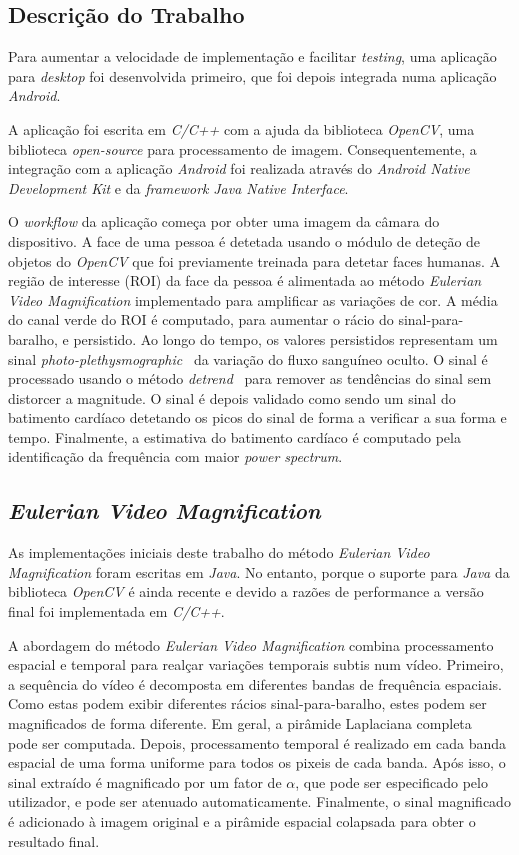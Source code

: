 \documentclass[9pt,a4paper]{extarticle}
\newcommand{\evm}{\emph{Eulerian Video Magnification}}
\begin{document}
\begin{multicols}{2}
\section{Descrição do Trabalho}\label{sec:work}

Para aumentar a velocidade de implementação e facilitar \emph{testing},
uma aplicação para \emph{desktop} foi desenvolvida primeiro, que foi
depois integrada numa aplicação \emph{Android}.

A aplicação foi escrita em \emph{C/C++} com a ajuda da biblioteca \emph{OpenCV},
uma biblioteca \emph{open-source} para processamento de imagem.
Consequentemente, a integração com a aplicação \emph{Android} foi realizada
através do \emph{Android Native Development Kit} e da \emph{framework}
\emph{Java Native Interface}.

O \emph{workflow} da aplicação começa por obter uma imagem da câmara do
dispositivo. A face de uma pessoa é detetada usando o módulo de deteção
de objetos do \emph{OpenCV} que foi previamente treinada para detetar faces
humanas. A região de interesse (ROI) da face da pessoa é alimentada ao método
\evm{} implementado para amplificar as variações de cor. A média do canal
verde do ROI é computado, para aumentar o rácio do sinal-para-baralho,
e persistido. Ao longo do tempo, os valores persistidos representam um sinal
\emph{photo-plethysmographic}~\cite{Verkruysse2008Remote} da variação do fluxo
sanguíneo oculto. O sinal é processado usando o método
\emph{detrend}~\cite{Tarvainen2002Advanced} para remover as tendências do
sinal sem distorcer a magnitude. O sinal é depois validado
como sendo um sinal do batimento cardíaco detetando os picos do sinal
de forma a verificar a sua forma e tempo. Finalmente, a estimativa do
batimento cardíaco é computado pela identificação da frequência com maior
\emph{power spectrum}.

\subsection{\evm}\label{sec:work:evm}

As implementações iniciais deste trabalho do método \evm{} foram escritas
em \emph{Java}. No entanto, porque o suporte para \emph{Java} da biblioteca
\emph{OpenCV} é ainda recente e devido a razões de performance a versão
final foi implementada em \emph{C/C++}.

A abordagem do método \evm{} combina processamento espacial e temporal para
realçar variações temporais subtis num vídeo. Primeiro, a sequência do vídeo
é decomposta em diferentes bandas de frequência espaciais. Como estas podem
exibir diferentes rácios sinal-para-baralho, estes podem ser magnificados
de forma diferente. Em geral, a pirâmide Laplaciana
completa~\cite{Burt1983Laplacian} pode ser computada. Depois, processamento
temporal é realizado em cada banda espacial de uma forma uniforme para todos
os pixeis de cada banda. Após isso, o sinal extraído é magnificado por um
fator de $\alpha$, que pode ser especificado pelo utilizador, e pode ser
atenuado automaticamente. Finalmente, o sinal magnificado é adicionado à
imagem original e a pirâmide espacial colapsada para obter o resultado final.


\end{multicols}
\end{document}

